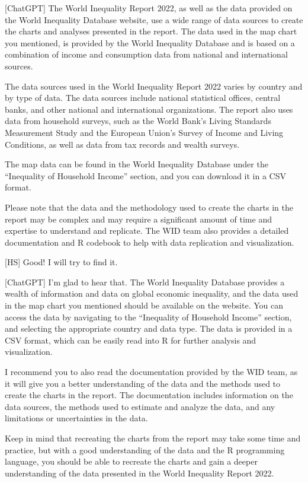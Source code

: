 \documentclass[
]{book}
\theoremstyle{definition}
\theoremstyle{definition}
\theoremstyle{definition}
\theoremstyle{definition}
\theoremstyle{remark}
\begin{document}
{[}ChatGPT{]} The World Inequality Report 2022, as well as the data provided on the World Inequality Database website, use a wide range of data sources to create the charts and analyses presented in the report. The data used in the map chart you mentioned, is provided by the World Inequality Database and is based on a combination of income and consumption data from national and international sources.

The data sources used in the World Inequality Report 2022 varies by country and by type of data. The data sources include national statistical offices, central banks, and other national and international organizations. The report also uses data from household surveys, such as the World Bank's Living Standards Measurement Study and the European Union's Survey of Income and Living Conditions, as well as data from tax records and wealth surveys.

The map data can be found in the World Inequality Database under the ``Inequality of Household Income'' section, and you can download it in a CSV format.

Please note that the data and the methodology used to create the charts in the report may be complex and may require a significant amount of time and expertise to understand and replicate. The WID team also provides a detailed documentation and R codebook to help with data replication and visualization.

{[}HS{]} Good! I will try to find it.

{[}ChatGPT{]} I'm glad to hear that. The World Inequality Database provides a wealth of information and data on global economic inequality, and the data used in the map chart you mentioned should be available on the website. You can access the data by navigating to the ``Inequality of Household Income'' section, and selecting the appropriate country and data type. The data is provided in a CSV format, which can be easily read into R for further analysis and visualization.

I recommend you to also read the documentation provided by the WID team, as it will give you a better understanding of the data and the methods used to create the charts in the report. The documentation includes information on the data sources, the methods used to estimate and analyze the data, and any limitations or uncertainties in the data.

Keep in mind that recreating the charts from the report may take some time and practice, but with a good understanding of the data and the R programming language, you should be able to recreate the charts and gain a deeper understanding of the data presented in the World Inequality Report 2022.
\end{document}
